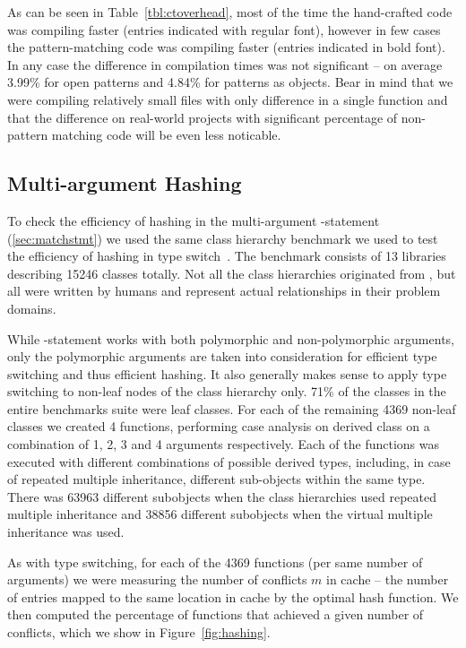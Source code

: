 As can be seen in Table~\ref{tbl:ctoverhead}, most of the time the hand-crafted 
code was compiling faster (entries indicated with regular font), however in few 
cases the pattern-matching code was compiling faster (entries indicated in bold 
font). In any case the difference in compilation times was not significant -- on 
average 3.99\% for open patterns and 4.84\% for patterns as objects. Bear in 
mind that we were compiling relatively small files with only difference in a 
single function and that the difference on real-world projects with significant 
percentage of non-pattern matching code will be even less noticable.

\subsection{Multi-argument Hashing}
\label{sec:morton}

To check the efficiency of hashing in the multi-argument -statement 
(\textsection\ref{sec:matchstmt}) we used the same class hierarchy benchmark we 
used to test the efficiency of hashing in type switch~\cite[]{TS12}.
The benchmark consists of 13 libraries describing 15246 classes totally. Not all 
the class hierarchies originated from \Cpp{}, but all were written by humans and 
represent actual relationships in their problem domains.

While -statement works with both polymorphic and non-polymorphic 
arguments, only the polymorphic arguments are taken into consideration for 
efficient type switching and thus efficient hashing. It also generally makes 
sense to apply type switching to non-leaf nodes of the class hierarchy only. 71\%
of the classes in the entire benchmarks suite were leaf classes. For each of the 
remaining 4369 non-leaf classes we created 4 functions, performing case analysis 
on derived class on a combination of 1, 2, 3 and 4 arguments respectively. Each 
of the functions was executed with different combinations of possible derived 
types, including, in case of repeated multiple inheritance, different 
sub-objects within the same type. There was 63963 different subobjects when the 
class hierarchies used repeated multiple inheritance and 38856 different 
subobjects when the virtual multiple inheritance was used.

As with type switching, for each of the 4369 functions (per same number of 
arguments) we were measuring the number of conflicts $m$ in cache -- the number 
of entries mapped to the same location in cache by the optimal hash function. 
We then computed the percentage of functions that achieved a given number of 
conflicts, which we show in Figure~\ref{fig:hashing}.

